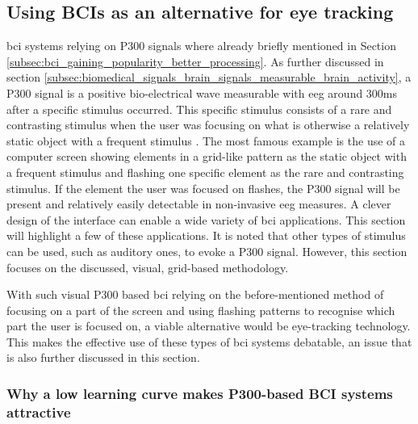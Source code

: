 
\subsection{Using BCIs as an alternative for eye tracking}
\label{subsec:bci_common_use_cases_bcis_replace_eye_tracking}

\gls{bci} systems relying on P300 signals where already briefly mentioned in Section \ref{subsec:bci_gaining_popularity_better_processing}.
As further discussed in section \ref{subsec:biomedical_signals_brain_signals_measurable_brain_activity}, a P300 signal is a positive bio-electrical wave measurable with \gls{eeg} around 300ms after a specific stimulus occurred.
This specific stimulus consists of a rare and contrasting stimulus when the user was focusing on what is otherwise a relatively static object with a frequent stimulus \citep{eye_tracking_vs_p300_comparable}.
The most famous example is the use of a computer screen showing elements in a grid-like pattern as the static object with a frequent stimulus and flashing one specific element as the rare and contrasting stimulus.
If the element the user was focused on flashes, the P300 signal will be present and relatively easily detectable in non-invasive \gls{eeg} measures.
A clever design of the interface can enable a wide variety of \gls{bci} applications.
This section will highlight a few of these applications.
It is noted that other types of stimulus can be used, such as auditory ones, to evoke a P300 signal.
However, this section focuses on the discussed, visual, grid-based methodology.

With such visual P300 based \gls{bci} relying on the before-mentioned method of focusing on a part of the screen and using flashing patterns to recognise which part the user is focused on, a viable alternative would be eye-tracking technology.
This makes the effective use of these types of \gls{bci} systems debatable, an issue that is also further discussed in this section.


\subsubsection{Why a low learning curve makes P300-based BCI systems attractive}
\label{subsubsec:bci_common_use_cases_bcis_replace_eye_tracking_why_p300}

